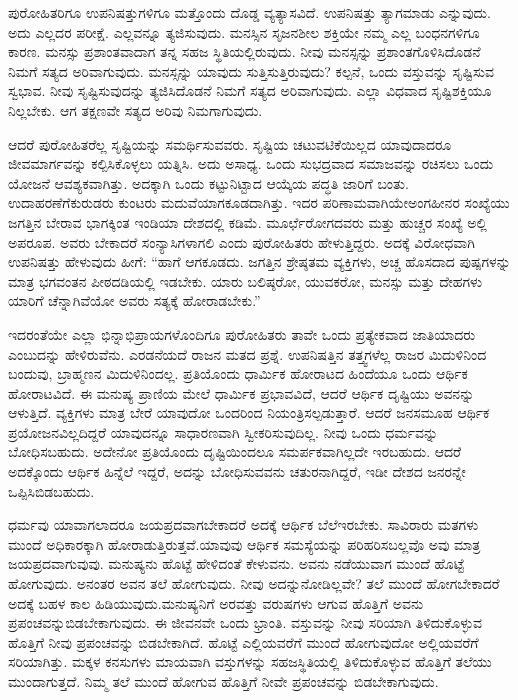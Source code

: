 ಪುರೋಹಿತರಿಗೂ ಉಪನಿಷತ್ತುಗಳಿಗೂ ಮತ್ತೊಂದು ದೊಡ್ಡ ವ್ಯತ್ಯಾಸವಿದೆ. ಉಪ\-ನಿಷತ್ತು ತ್ಯಾಗಮಾಡು ಎನ್ನುವುದು. ಅದು ಎಲ್ಲದರ ಪರೀಕ್ಷೆ. ಎಲ್ಲವನ್ನೂ ತ್ಯಜಿಸುವುದು. ಮನಸ್ಸಿನ ಸೃಜನಶೀಲ ಶಕ್ತಿಯೇ ನಮ್ಮ ಎಲ್ಲ ಬಂಧನಗಳಿಗೂ ಕಾರಣ. ಮನಸ್ಸು ಪ್ರಶಾಂತವಾದಾಗ ತನ್ನ ಸಹಜ ಸ್ಥಿತಿಯಲ್ಲಿರುವುದು. ನೀವು ಮನಸ್ಸನ್ನು ಪ್ರಶಾಂತಗೊಳಿಸಿದೊಡನೆ ನಿಮಗೆ ಸತ್ಯದ ಅರಿವಾಗುವುದು. ಮನಸ್ಸನ್ನು ಯಾವುದು ಸುತ್ತಿಸುತ್ತಿರುವುದು? ಕಲ್ಪನೆ, ಒಂದು ವಸ್ತುವನ್ನು ಸೃಷ್ಟಿಸುವ ಸ್ವಭಾವ. ನೀವು ಸೃಷ್ಟಿಸುವುದನ್ನು ತ್ಯಜಿಸಿದೊಡನೆ ನಿಮಗೆ ಸತ್ಯದ ಅರಿವಾಗುವುದು. ಎಲ್ಲಾ ವಿಧವಾದ ಸೃಷ್ಟಿಶಕ್ತಿಯೂ ನಿಲ್ಲಬೇಕು. ಆಗ ತಕ್ಷಣವೇ ಸತ್ಯದ ಅರಿವು ನಿಮಗಾಗುವುದು.

ಆದರೆ ಪುರೋಹಿತರೆಲ್ಲ ಸೃಷ್ಟಿಯನ್ನು ಸಮರ್ಥಿಸುವವರು. ಸೃಷ್ಟಿಯ ಚಟುವಟಿಕೆ\-ಯಿಲ್ಲದ ಯಾವುದಾದರೂ ಜೀವಮಾರ್ಗವನ್ನು ಕಲ್ಪಿಸಿಕೊಳ್ಳಲು ಯತ್ನಿಸಿ. ಅದು ಅಸಾಧ್ಯ. ಒಂದು ಸುಭದ್ರವಾದ ಸಮಾಜವನ್ನು ರಚಿಸಲು ಒಂದು ಯೋಜನೆ ಆವಶ್ಯಕವಾಗಿತ್ತು. ಅದಕ್ಕಾಗಿ ಒಂದು ಕಟ್ಟುನಿಟ್ಟಾದ ಆಯ್ಕೆಯ ಪದ್ಧತಿ ಜಾರಿಗೆ ಬಂತು. ಉದಾಹರಣೆಗೆ\break ಕುರುಡರು ಕುಂಟರು ಮದುವೆಯಾಗಕೂಡದಾಗಿತ್ತು. ಇದರ ಪರಿಣಾಮವಾಗಿಯೇ\break ಅಂಗಹೀನರ ಸಂಖ್ಯೆಯು ಜಗತ್ತಿನ ಬೇರಾವ ಭಾಗಕ್ಕಿಂತ ಇಂಡಿಯಾ ದೇಶದಲ್ಲಿ ಕಡಿಮೆ. ಮೂರ್ಛೆರೋಗದವರು ಮತ್ತು ಹುಚ್ಚರ ಸಂಖ್ಯೆ ಅಲ್ಲಿ ಅಪರೂಪ. ಅವರು ಬೇಕಾದರೆ ಸಂನ್ಯಾಸಿಗಳಾಗಲಿ ಎಂದು ಪುರೋಹಿತರು ಹೇಳುತ್ತಿದ್ದರು. ಅದಕ್ಕೆ ವಿರೋಧವಾಗಿ ಉಪನಿಷತ್ತು ಹೇಳುವುದು ಹೀಗೆ: “ಹಾಗೆ ಆಗಕೂಡದು. ಜಗತ್ತಿನ ಶ್ರೇಷ್ಠತಮ ವ್ಯಕ್ತಿಗಳು, ಅಚ್ಚ ಹೊಸದಾದ ಪುಷ್ಪಗಳನ್ನು ಮಾತ್ರ ಭಗವಂತನ ಪೀಠದಡಿಯಲ್ಲಿ ಇಡಬೇಕು. ಯಾರು ಬಲಿಷ್ಠರೋ, ಯುವಕರೋ, ಮನಸ್ಸು ಮತ್ತು ದೇಹಗಳು ಯಾರಿಗೆ ಚೆನ್ನಾಗಿವೆಯೋ ಅವರು ಸತ್ಯಕ್ಕೆ ಹೋರಾಡಬೇಕು.”

ಇದರಂತೆಯೇ ಎಲ್ಲಾ ಭಿನ್ನಾಭಿಪ್ರಾಯಗಳೊಂದಿಗೂ ಪುರೋಹಿತರು ತಾವೇ ಒಂದು ಪ್ರತ್ಯೇಕವಾದ ಜಾತಿಯಾದರು ಎಂಬುದನ್ನು ಹೇಳಿರುವೆನು. ಎರಡನೆಯದೆ ರಾಜನ ಮತದ ಪ್ರಶ್ನೆ. ಉಪನಿಷತ್ತಿನ ತತ್ತ್ವಗಳೆಲ್ಲ ರಾಜರ ಮಿದುಳಿನಿಂದ ಬಂದುವು, ಬ್ರಾಹ್ಮಣನ ಮಿದುಳಿನಿಂದಲ್ಲ. ಪ್ರತಿಯೊಂದು ಧಾರ್ಮಿಕ ಹೋರಾಟದ ಹಿಂದೆಯೂ ಒಂದು ಆರ್ಥಿಕ ಹೋರಾಟವಿದೆ. ಈ ಮನುಷ್ಯ ಪ್ರಾಣಿಯ ಮೇಲೆ ಧಾರ್ಮಿಕ ಪ್ರಭಾವವಿದೆ, ಆದರೆ ಆರ್ಥಿಕ ದೃಷ್ಟಿಯು ಅವನನ್ನು ಆಳುತ್ತಿದೆ. ವ್ಯಕ್ತಿಗಳು ಮಾತ್ರ ಬೇರೆ ಯಾವುದೋ ಒಂದರಿಂದ ನಿಯಂತ್ರಿಸಲ್ಪಡುತ್ತಾರೆ. ಆದರೆ ಜನಸಮೂಹ ಆರ್ಥಿಕ ಪ್ರಯೋಜನವಿಲ್ಲದಿದ್ದರೆ ಯಾವುದನ್ನೂ ಸಾಧಾರಣವಾಗಿ ಸ್ವೀಕರಿಸುವುದಿಲ್ಲ. ನೀವು ಒಂದು ಧರ್ಮವನ್ನು ಬೋಧಿಸ\-ಬಹುದು. ಅದೇನೋ ಪ್ರತಿಯೊಂದು ದೃಷ್ಟಿಯಿಂದಲೂ ಸಮರ್ಪಕವಾಗಿಲ್ಲದೇ ಇರಬಹುದು. ಆದರೆ ಅದಕ್ಕೊಂದು ಆರ್ಥಿಕ ಹಿನ್ನೆಲೆ ಇದ್ದರೆ, ಅದನ್ನು ಬೋಧಿಸುವವನು ಚತುರನಾಗಿದ್ದರೆ, ಇಡೀ ದೇಶದ ಜನರನ್ನೇ ಒಪ್ಪಿಸಿಬಿಡಬಹುದು.

ಧರ್ಮವು ಯಾವಾಗಲಾದರೂ ಜಯಪ್ರದವಾಗಬೇಕಾದರೆ ಅದಕ್ಕೆ ಆರ್ಥಿಕ ಬೆಲೆ\break ಇರಬೇಕು. ಸಾವಿರಾರು ಮತಗಳು ಮುಂದೆ ಅಧಿಕಾರಕ್ಕಾಗಿ ಹೋರಾಡುತ್ತಿರುತ್ತವೆ.\break ಯಾವುವು ಆರ್ಥಿಕ ಸಮಸ್ಯೆಯನ್ನು ಪರಿಹರಿಸಬಲ್ಲವೊ ಅವು ಮಾತ್ರ ಜಯಪ್ರದವಾಗು\-ವುವು. ಮನುಷ್ಯನು ಹೊಟ್ಟೆ ಹೇಳಿದಂತೆ ಕೇಳುವನು. ಅವನು ನಡೆಯುವಾಗ ಮುಂದೆ ಹೊಟ್ಟೆ ಹೋಗುವುದು. ಅನಂತರ ಅವನ ತಲೆ ಹೋಗುವುದು. ನೀವು ಅದನ್ನು\break ನೋಡಿಲ್ಲವೇ? ತಲೆ ಮುಂದೆ ಹೋಗಬೇಕಾದರೆ ಅದಕ್ಕೆ ಬಹಳ ಕಾಲ ಹಿಡಿಯುವುದು.\break ಮನುಷ್ಯನಿಗೆ ಅರವತ್ತು ವರುಷಗಳು ಆಗುವ ಹೊತ್ತಿಗೆ ಅವನು ಪ್ರಪಂಚವನ್ನು\break ಬಿಡಬೇಕಾಗುವುದು. ಈ ಜೀವನವೇ ಒಂದು ಭ್ರಾಂತಿ. ವಸ್ತುವನ್ನು ನೀವು ಸರಿಯಾಗಿ ತಿಳಿದುಕೊಳ್ಳುವ ಹೊತ್ತಿಗೆ ನೀವು ಪ್ರಪಂಚವನ್ನು ಬಿಡಬೇಕಾಗಿದೆ. ಹೊಟ್ಟೆ ಎಲ್ಲಿಯವರೆಗೆ ಮುಂದೆ ಹೋಗುವುದೋ ಅಲ್ಲಿಯವರೆಗೆ ಸರಿಯಾಗಿತ್ತು. ಮಕ್ಕಳ ಕನಸುಗಳು ಮಾಯವಾಗಿ ವಸ್ತುಗಳನ್ನು ಸಹಜಸ್ಥಿತಿಯಲ್ಲಿ ತಿಳಿದುಕೊಳ್ಳುವ ಹೊತ್ತಿಗೆ ತಲೆಯು ಮುಂದಾಗುತ್ತದೆ. ನಿಮ್ಮ ತಲೆ ಮುಂದೆ ಹೋಗುವ ಹೊತ್ತಿಗೆ ನೀವೇ ಪ್ರಪಂಚವನ್ನು ಬಿಡಬೇಕಾಗುವುದು.

